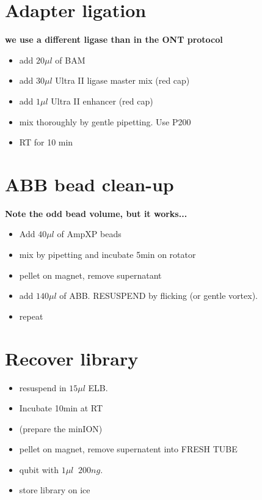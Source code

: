\documentclass[aps,rmp]{revtex4}
\begin{document}
\section*{Adapter ligation}
{\bf we use a different ligase than in the ONT protocol}
\begin{itemize}
	\item add $20\mu l$ of BAM
	\item add $30\mu l$ Ultra II ligase master mix  (red cap)
	\item add $1\mu l$ Ultra II enhancer (red cap)
	\item mix thoroughly by gentle pipetting. Use P200
	\item RT for 10 min
\end{itemize}


\section*{ABB bead clean-up}
{\bf Note the odd bead volume, but it works...}
\begin{itemize}
	\item Add $40\mu l$ of AmpXP beads
	\item mix by pipetting and incubate 5min on rotator
	\item pellet on magnet, remove supernatant
	\item add $140\mu l$ of ABB. RESUSPEND by flicking (or gentle vortex).
	\item repeat
\end{itemize}

\section*{Recover library}
\begin{itemize}
	\item resuspend in $15\mu l$ ELB.
	\item Incubate 10min at RT
	\item (prepare the minION)
	\item pellet on magnet, remove supernatent into FRESH TUBE
	\item qubit with $1\mu l$ $~200ng$.
	\item store library on ice
\end{itemize}
\end{document}
